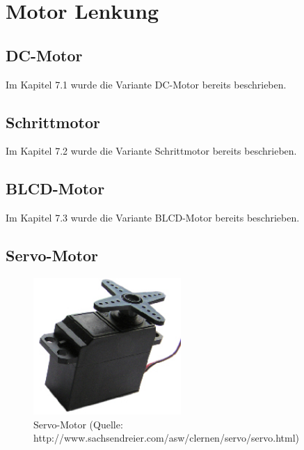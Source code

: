 
\section{Motor Lenkung}


\subsection{DC-Motor}

Im Kapitel 7.1 wurde die Variante DC-Motor bereits beschrieben.


\subsection{Schrittmotor}
Im Kapitel 7.2 wurde die Variante Schrittmotor bereits beschrieben.

\subsection{BLCD-Motor}
Im Kapitel 7.3 wurde die Variante BLCD-Motor bereits beschrieben.

\subsection{Servo-Motor}

\begin{figure}[h!]%
\centering
\includegraphics[width=0.5\textwidth]{fig/servo.jpg}
\caption{Servo-Motor (Quelle: http://www.sachsendreier.com/asw/clernen/servo/servo.html)}
\label{fig:Java}
\end{figure}

